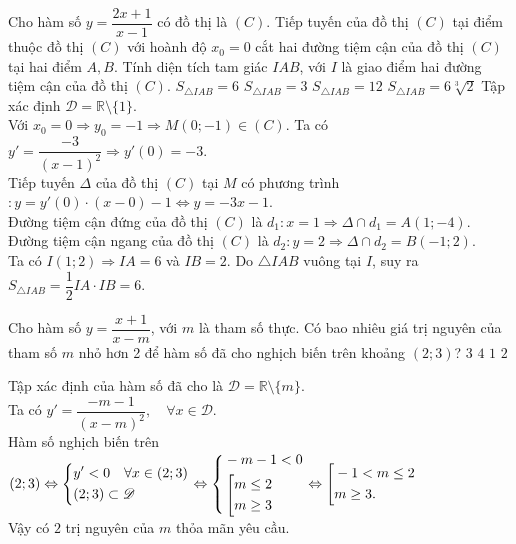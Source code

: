 \begin{ex}%
	Cho hàm số $y=\dfrac{2x+1}{x-1}$  có đồ thị là $(C)$. Tiếp tuyến của đồ thị $(C)$  tại điểm thuộc đồ thị $(C)$ với hoành độ $x_0=0$ cắt hai đường tiệm cận của đồ thị $(C)$ tại hai điểm $A, B$. Tính diện tích tam giác $IAB$, với $I$ là giao điểm hai đường tiệm cận của đồ thị $(C)$.
		\choice
	{\True $S_{\triangle IAB} =6$}
	{$S_{\triangle IAB} =3$}
	{$S_{\triangle IAB} =12$}
	{$S_{\triangle IAB} =6\sqrt[3]{2}$}
	\loigiai
	{Tập xác định $\mathscr {D}= \mathbb{R}\setminus \{1\}$.\\
	Với $x_0=0 \Rightarrow y_0=-1 \Rightarrow M(0;-1) \in (C)$. Ta có $y'=\dfrac{-3}{(x-1)^2} \Rightarrow y'(0)=-3.$\\
	Tiếp tuyến $\Delta$ của đồ thị $(C)$ tại $M$ có phương trình $\colon y=y'(0)\cdot (x-0)-1 \Leftrightarrow y= -3x-1$.\\
	Đường tiệm cận đứng của đồ thị $(C)$ là $d_1\colon x=1 \Rightarrow \Delta \cap d_1 = A(1;-4)$.\\
	Đường tiệm cận ngang của đồ thị $(C)$ là $d_2 \colon y=2 \Rightarrow \Delta \cap d_2 = B(-1;2)$.\\
	Ta có $I(1;2) \Rightarrow IA= 6$ và $IB=2$. Do $\triangle IAB$ vuông tại $I$, suy ra $S_{\triangle IAB} =\dfrac{1}{2}IA \cdot IB=6.$
	}
\end{ex}

\begin{ex}%
	Cho hàm số $y=\dfrac{x+1}{x-m}$, với $m$ là tham số thực. Có bao nhiêu giá trị nguyên của tham số $m$ nhỏ hơn 2 để hàm số đã cho nghịch biến trên khoảng $(2;3)$?
		\choice
	{$3$}
	{$4$}
	{$1$}
	{\True $2$}
	\loigiai
	{Tập xác định của hàm số đã cho là $\mathscr {D}= \mathbb{R} \setminus \{m\}$.\\
		Ta có $y'=\dfrac{-m-1}{(x-m)^2}, \quad \forall x \in \mathscr {D} $.\\
		Hàm số nghịch biến trên  $(2;3) \Leftrightarrow \left\{\begin{aligned}&y'<0 \quad \forall x \in (2;3)\\& (2;3) \subset \mathscr {D}\end{aligned}\right. \Leftrightarrow \left\{\begin{aligned}&-m-1<0\\& \left[\begin{aligned}&m\leq 2\\& m\geq 3 \end{aligned}\right.\end{aligned}\right. \Leftrightarrow \left[\begin{aligned}& -1<m\leq 2\\&m\geq 3.\end{aligned}\right.$\\
		Vậy có $2$ trị nguyên của $m$ thỏa mãn yêu cầu.
		
	}
\end{ex}

